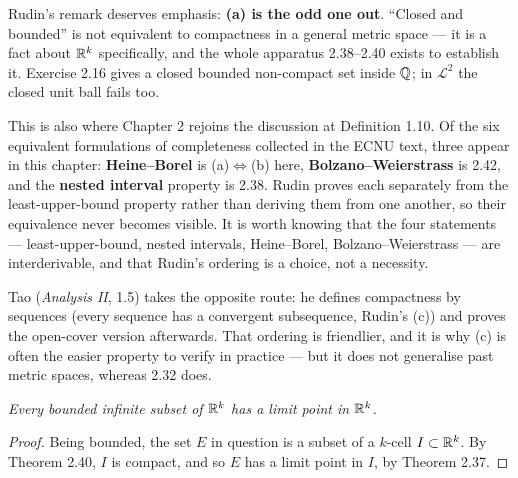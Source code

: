 \begin{center}
\end{center}

\begin{deeper}
Rudin's remark deserves emphasis: \textbf{(a) is the odd one out}. ``Closed and
bounded'' is not equivalent to compactness in a general metric space --- it is
a fact about $\mathbb{R}^k$ specifically, and the whole apparatus 2.38--2.40 exists to
establish it. Exercise 2.16 gives a closed bounded non-compact set inside $\mathbb{Q}$;
in $\mathscr{L}^2$ the closed unit ball fails too.

\smallskip
This is also where Chapter 2 rejoins the discussion at Definition 1.10. Of the
six equivalent formulations of completeness collected in the ECNU text, three
appear in this chapter: \textbf{Heine--Borel} is (a)$\Leftrightarrow$(b) here,
\textbf{Bolzano--Weierstrass} is 2.42, and the \textbf{nested interval}
property is 2.38. Rudin proves each separately from the least-upper-bound
property rather than deriving them from one another, so their equivalence never
becomes visible. It is worth knowing that the four statements ---
least-upper-bound, nested intervals, Heine--Borel, Bolzano--Weierstrass --- are
interderivable, and that Rudin's ordering is a choice, not a necessity.

\smallskip
Tao (\emph{Analysis II}, 1.5) takes the opposite route: he defines compactness
by sequences (every sequence has a convergent subsequence, Rudin's (c)) and
proves the open-cover version afterwards. That ordering is friendlier, and it
is why (c) is often the easier property to verify in practice --- but it does
not generalise past metric spaces, whereas 2.32 does.
\end{deeper}

\emph{Every bounded infinite subset of $\mathbb{R}^k$ has a limit point in $\mathbb{R}^k$.}

\begin{proof}
Being bounded, the set $E$ in question is a subset of a $k$-cell
$I \subset \mathbb{R}^k$. By Theorem 2.40, $I$ is compact, and so $E$ has a limit point
in $I$, by Theorem 2.37.
\end{proof}
